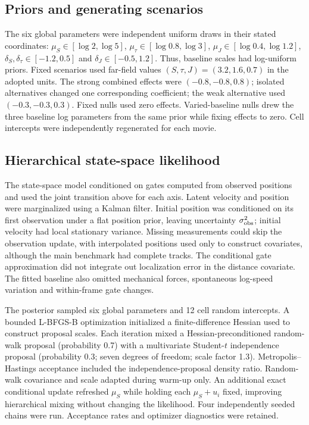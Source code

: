 \documentclass[12pt]{article}
\begin{document}
\subsection*{Priors and generating scenarios}
The six global parameters were independent uniform draws in their stated coordinates: $\mu_S\in[\log2,\log5]$, $\mu_\tau\in[\log0.8,\log3]$, $\mu_J\in[\log0.4,\log1.2]$, $\delta_S,\delta_\tau\in[-1.2,0.5]$ and $\delta_J\in[-0.5,1.2]$. Thus, baseline scales had log-uniform priors. Fixed scenarios used far-field values $(S,\tau,J)=(3.2,1.6,0.7)$ in the adopted units. The strong combined effects were $(-0.8,-0.8,0.8)$; isolated alternatives changed one corresponding coefficient; the weak alternative used $(-0.3,-0.3,0.3)$. Fixed nulls used zero effects. Varied-baseline nulls drew the three baseline log parameters from the same prior while fixing effects to zero. Cell intercepts were independently regenerated for each movie.

\subsection*{Hierarchical state-space likelihood}
The state-space model conditioned on gates computed from observed positions and used the joint transition above for each axis. Latent velocity and position were marginalized using a Kalman filter\citep{kalman1960}. Initial position was conditioned on its first observation under a flat position prior, leaving uncertainty $\sigma_{\rm obs}^2$; initial velocity had local stationary variance. Missing measurements could skip the observation update, with interpolated positions used only to construct covariates, although the main benchmark had complete tracks. The conditional gate approximation did not integrate out localization error in the distance covariate. The fitted baseline also omitted mechanical forces, spontaneous log-speed variation and within-frame gate changes.

The posterior sampled six global parameters and 12 cell random intercepts. A bounded L-BFGS-B optimization initialized a finite-difference Hessian used to construct proposal scales. Each iteration mixed a Hessian-preconditioned random-walk proposal (probability 0.7) with a multivariate Student-$t$ independence proposal (probability 0.3; seven degrees of freedom; scale factor 1.3). Metropolis--Hastings acceptance included the independence-proposal density ratio. Random-walk covariance and scale adapted during warm-up only. An additional exact conditional update refreshed $\mu_S$ while holding each $\mu_S+u_i$ fixed, improving hierarchical mixing without changing the likelihood. Four independently seeded chains were run. Acceptance rates and optimizer diagnostics were retained.
\end{document}
